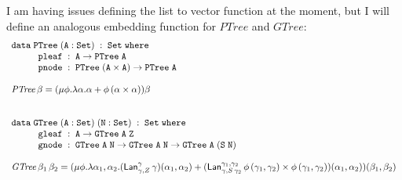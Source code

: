 \documentclass[acmsmall,review,anonymous]{acmart}
\theoremstyle{definition}
\begin{document}
{\color{red} I am having issues defining the list to vector function at the moment, but I will define an analogous
embedding function for $\mathit{PTree}$ and $\mathit{GTree}$:}
\[\begin{array}{l}
  \mathtt{data\; PTree\;(A : Set)\;:\;Set\;where}\\
  \hspace*{0.4in}\mathtt{pleaf\;:\; A \rightarrow PTree\;A}\\
  \hspace*{0.4in}\mathtt{pnode\;:\; PTree\;(A \times A) \rightarrow PTree\;A} \\ \\
  \mathit{PTree} \, \beta = 
    (\mu \phi. \lambda \alpha. \alpha + \phi\,(\alpha \times \alpha))\beta \\ \\ \\

  \mathtt{data\; GTree\;(A : Set)\;(N : Set)\;:\;Set\;where}\\
  \hspace*{0.4in}\mathtt{gleaf\;:\; A \rightarrow GTree\;A\;Z}\\
  \hspace*{0.4in}\mathtt{gnode\;:\; GTree\;A\;N \rightarrow GTree\;A\;N 
        \rightarrow GTree\;A\;(S\;N)} \\ \\

  \mathit{GTree} \, \beta_1 \, \beta_2 =
    (\mu \phi. \lambda \alpha_1, \alpha_2.
      (\mathsf{Lan}^\gamma_{\gamma, Z} \, \gamma)(\alpha_1, \alpha_2)
    + (\mathsf{Lan}^{\gamma_1, \gamma_2}_{\gamma, S\,\gamma_2} \, \phi\,(\gamma_1,\gamma_2) \times \phi\,(\gamma_1,\gamma_2))(\alpha_1, \alpha_2)
    )(\beta_1, \beta_2) 
\end{array}\]

\end{document}
